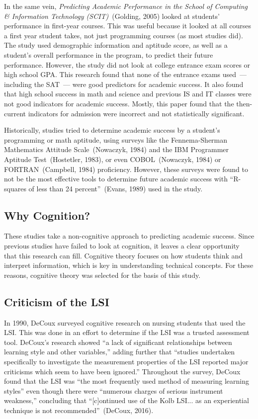 In the same vein, \textit{Predicting Academic Performance in the School of Computing \& Information Technology (SCIT)}~(Golding, 2005) looked at students' performance in first-year courses. This was useful because it looked at all courses a first year student takes, not just programming courses (as most studies did). The study used demographic information and aptitude score, as well as a student's overall performance in the program, to predict their future performance. However, the study did not look at college entrance exam scores or high school GPA. This research found that none of the entrance exams used~--- including the SAT~--- were good predictors for academic success. It also found that high school success in math and science and previous IS and IT classes were not good indicators for academic success. Mostly, this paper found that the then-current indicators for admission were incorrect and not statistically significant.

Historically, studies tried to determine academic success by a student's programming or math aptitude, using surveys like the Fennema-Sherman Mathematics Attitude Scale~(Nowaczyk, 1984) and the IBM Programmer Aptitude Test~(Hostetler, 1983), or even COBOL~(Nowaczyk, 1984) or FORTRAN~(Campbell, 1984) proficiency. However, these surveys were found to not be the most effective tools to determine future academic success with ``R-squares of less than 24 percent''~(Evans, 1989) used in the study.

\subsection{Why Cognition?}
These studies take a non-cognitive approach to predicting academic success. Since previous studies have failed to look at cognition, it leaves a clear opportunity that this research can fill. Cognitive theory focuses on how students think and interpret information, which is key in understanding technical concepts. For these reasons, cognitive theory was selected for the basis of this study.

\subsection{Criticism of the LSI}
In 1990, DeCoux surveyed cognitive research on nursing students that used the LSI. This was done in an effort to determine if the LSI was a trusted assessment tool. DeCoux's research showed ``a lack of significant relationships between learning style and other variables,'' adding further that ``studies undertaken specifically to investigate the measurement properties of the LSI reported major criticisms which seem to have been ignored.'' Throughout the survey, DeCoux found that the LSI was ``the most frequently used method of measuring learning styles'' even though there were ``numerous charges of serious instrument weakness,'' concluding that ``[c]ontinued use of the Kolb LSI... as an experiential technique is not recommended''~(DeCoux, 2016).

